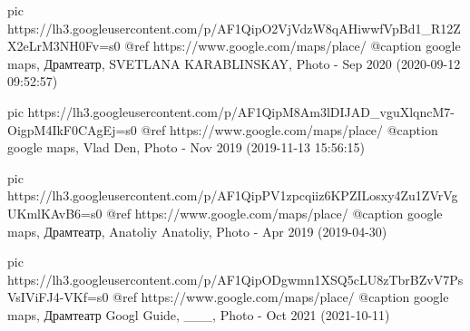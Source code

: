      pic https://lh3.googleusercontent.com/p/AF1QipO2VjVdzW8qAHiwwfVpBd1_R12ZX2eLrM3NH0Fv=s0
     @ref https://www.google.com/maps/place/%
     @caption google maps, Драмтеатр, SVETLANA KARABLINSKAY, Photo - Sep 2020 (2020-09-12 09:52:57)

     pic https://lh3.googleusercontent.com/p/AF1QipM8Am3lDIJAD_vguXlqncM7-OigpM4IkF0CAgEj=s0
     @ref https://www.google.com/maps/place/%
     @caption google maps, Vlad Den, Photo - Nov 2019 (2019-11-13 15:56:15)

     pic https://lh3.googleusercontent.com/p/AF1QipPV1zpcqiiz6KPZILosxy4Zu1ZVrVgUKmlKAvB6=s0
     @ref https://www.google.com/maps/place/%
     @caption google maps, Драмтеатр, Anatoliy Anatoliy, Photo - Apr 2019 (2019-04-30)

     pic https://lh3.googleusercontent.com/p/AF1QipODgwmn1XSQ5cLU8zTbrBZvV7PsVsIViFJ4-VKf=s0
     @ref https://www.google.com/maps/place/%
     @caption google maps, Драмтеатр Googl Guide, ___, Photo - Oct 2021 (2021-10-11)

